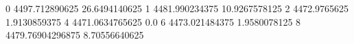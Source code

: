 0 4497.712890625 26.6494140625
1 4481.990234375 10.9267578125
2 4472.9765625 1.9130859375
4 4471.0634765625 0.0
6 4473.021484375 1.9580078125
8 4479.76904296875 8.70556640625

